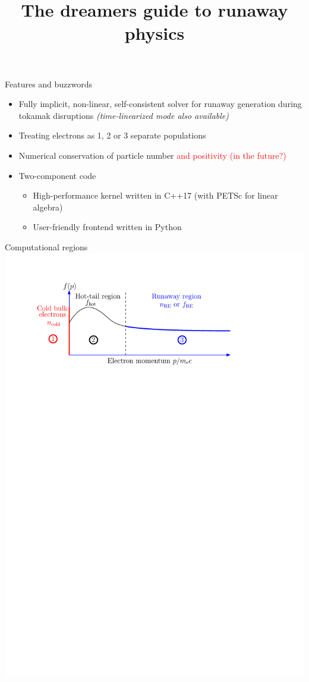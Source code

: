\documentclass[titleunderline,widescreen1610]{chalmerspresentation}
\title{The dreamers guide to runaway physics}
\begin{document}
    {
        \begin{frame}
            \titlepage
        \end{frame}
    }

    \begin{frame}{Features and buzzwords}
        \begin{itemize}
            \item Fully implicit, non-linear, self-consistent solver for runaway generation during tokamak disruptions \emph{(time-linearized mode also available)}
            \item Treating electrons as 1, 2 or 3 separate populations
            \item Numerical conservation of particle number \textcolor{red}{and positivity (in the future?)}
            \item Two-component code
            \begin{itemize}
                \item High-performance kernel written in C++17 (with PETSc for linear algebra)
                \item User-friendly frontend written in Python
            \end{itemize}
        \end{itemize}
    \end{frame}

    \begin{frame}{Computational regions}
        \includegraphics[width=\textwidth]{figs/regions.pdf}
    \end{frame}
\end{document}
